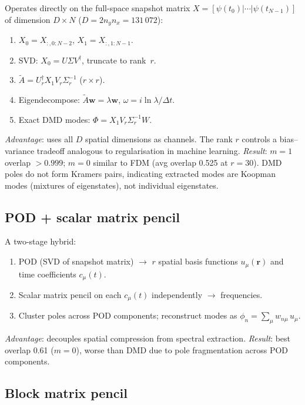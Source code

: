 \documentclass[11pt,a4paper]{article}
\newcommand{\vb}[1]{\mathbf{#1}}
\begin{document}
Operates directly on the full-space snapshot matrix
$X = [\psi(t_0) | \cdots | \psi(t_{N-1})]$ of dimension $D \times N$
($D = 2 n_y n_x = 131\,072$):
\begin{enumerate}
  \item $X_0 = X_{:,0:N-2}$, $X_1 = X_{:,1:N-1}$.
  \item SVD: $X_0 = U\Sigma V^\dagger$, truncate to rank~$r$.
  \item $\tilde{A} = U_r^\dagger X_1 V_r \Sigma_r^{-1}$ \quad ($r\times r$).
  \item Eigendecompose: $\tilde{A}\vb{w} = \lambda\vb{w}$,
        $\omega = i\ln\lambda/\Delta t$.
  \item Exact DMD modes: $\Phi = X_1 V_r \Sigma_r^{-1} W$.
\end{enumerate}

\emph{Advantage}: uses all $D$ spatial dimensions as channels.
The rank $r$ controls a bias--variance tradeoff analogous to
regularisation in machine learning.
\emph{Result}: $m=1$ overlap $>0.999$; $m=0$ similar to FDM
(avg overlap 0.525 at $r=30$).  DMD poles do not form Kramers pairs,
indicating extracted modes are Koopman modes (mixtures of
eigenstates), not individual eigenstates.

\subsection{POD + scalar matrix pencil}

A two-stage hybrid:
\begin{enumerate}
  \item POD (SVD of snapshot matrix) $\to$ $r$ spatial basis
        functions $u_\mu(\vb{r})$ and time coefficients $c_\mu(t)$.
  \item Scalar matrix pencil on each $c_\mu(t)$ independently
        $\to$ frequencies.
  \item Cluster poles across POD components; reconstruct modes
        as $\phi_n = \sum_\mu w_{n\mu}\, u_\mu$.
\end{enumerate}

\emph{Advantage}: decouples spatial compression from spectral
extraction.  \emph{Result}: best overlap 0.61 ($m=0$), worse than
DMD due to pole fragmentation across POD components.

\subsection{Block matrix pencil}
\end{document}
